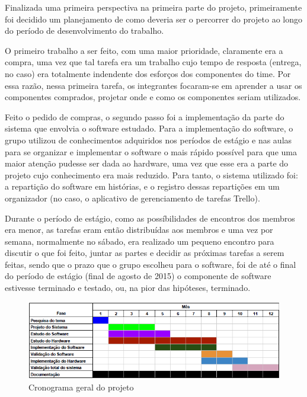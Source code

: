\label{Métodos de implementação}

Finalizada uma primeira perspectiva na primeira parte do projeto, primeiramente foi decidido um planejamento de como deveria ser o percorrer do projeto ao longo do período de desenvolvimento do trabalho.

O primeiro trabalho a ser feito, com uma maior prioridade, claramente era a compra, uma vez que tal tarefa era um trabalho cujo tempo de resposta (entrega, no caso) era totalmente indendente dos esforços dos componentes do time. Por essa razão, nessa primeira tarefa, os integrantes focaram-se em aprender a usar os componentes comprados, projetar onde e como os componentes seriam utilizados.

Feito o pedido de compras, o segundo passo foi a implementação da parte do sistema que envolvia o software estudado. Para a implementação do software, o grupo utilizou de conhecimentos adquiridos nos períodos de estágio e nas aulas para se organizar e implementar o software o mais rápido possível para que uma maior atenção pudesse ser dada ao hardware, uma vez que esse era a parte do projeto cujo conhecimento era mais reduzido. Para tanto, o sistema utilizado foi: a repartição do software em histórias, e o registro dessas repartições em um organizador (no caso, o aplicativo de gerenciamento de tarefas Trello). 

Durante o período de estágio, como as possíbilidades de encontros dos membros era menor, as tarefas eram então distribuídas aos membros e uma vez por semana, normalmente no sábado, era realizado um pequeno encontro para discutir o que foi feito, juntar as partes e decidir as próximas tarefas a serem feitas, sendo que o prazo que o grupo escolheu para o software, foi de até o final do período de estágio (final de agosto de 2015) o componente de software estivesse terminado e testado, ou, na pior das hipóteses, terminado.

\begin{figure}
\centering
\includegraphics[width=1\textwidth]{figuras/cronogram.png}
\caption{\label{fig:cronogram} Cronograma geral do projeto}
\end{figure}